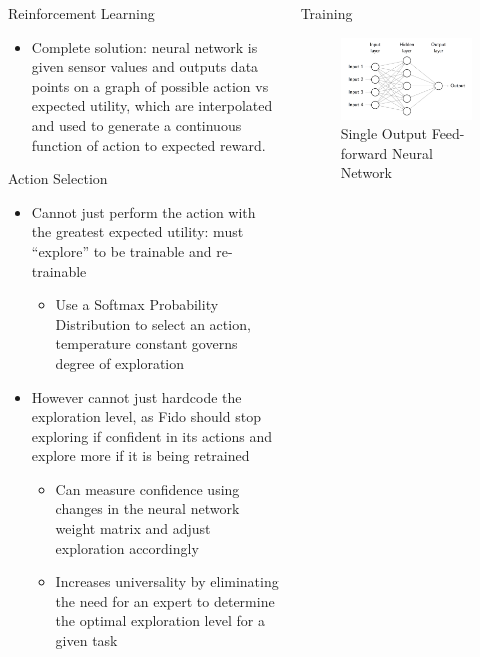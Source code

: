 \documentclass[final]{beamer}
\newlength{\onecolwid}
\newlength{\twocolwid}
\begin{document}
\begin{frame}[t]
\begin{columns}[t]
\begin{column}{\twocolwid}
\begin{columns}[t,totalwidth=\twocolwid]
\begin{column}{\onecolwid}
\begin{block}{Reinforcement Learning}
\begin{itemize}
				\item Complete solution: neural network is given sensor values and outputs data points on a graph of possible action vs expected utility, which are interpolated and used to generate a continuous function of action to expected reward.
			\end{itemize}
			\vspace{-1.25cm}
		\end{block}
		\begin{block}{Action Selection}
			\begin{itemize}
				\item Cannot just perform the action with the greatest expected utility: must ``explore'' to be trainable and re-trainable
				\begin{itemize}
					\item Use a Softmax Probability Distribution to select an action, temperature constant governs degree of exploration
				\end{itemize}
				\item However cannot just hardcode the exploration level, as Fido should stop exploring if confident in its actions and explore more if it is being retrained
				\begin{itemize}
					\item Can measure confidence using changes in the neural network weight matrix and adjust exploration accordingly
					\item Increases universality by eliminating the need for an expert to determine the optimal exploration level for a given task
				\end{itemize}
			\end{itemize}
		\end{block}
	\end{column}

	\begin{column}{\onecolwid}\begin{block}{Training}

	\begin{figure}
		\centering
		\includegraphics[width=.8\linewidth]{Figures/FeedForwardRendered}
		\caption{Single Output Feed-forward Neural Network}
		\label{fig:feedforward}
	\end{figure}


\end{block}
\end{column}
\end{columns}
\end{column}
\end{columns}
\end{frame}
\end{document}
